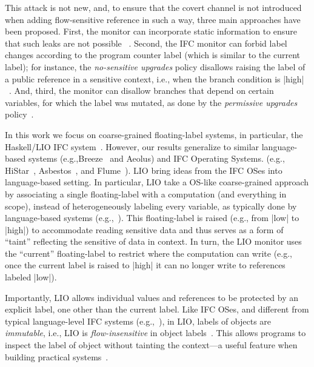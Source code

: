 This attack is not new, and, to ensure that the covert channel is
not introduced when adding flow-sensitive reference in such a way,
three main approaches have been proposed.  First, the monitor can
incorporate static information to ensure that such leaks are not
possible~\cite{Russo:2010,stefan:lio,Breeze} .  Second, the IFC monitor can
forbid label changes according to the program counter label (which is
similar to the current label); for instance, the \emph{no-sensitive
upgrades} policy disallows raising the label of a public reference in
a sensitive context, i.e., when the branch condition is
|high|~\cite{Zdancewic02programminglanguages,Austin:Flanagan:PLAS09}.
And, third, the monitor can disallow branches that depend on certain
variables, for which the label was mutated, as done by the
\emph{permissive upgrades} policy~\cite{Austin:Flanagan:PLAS10}.

In this work we focus on coarse-grained floating-label systems, in
particular, the Haskell/LIO IFC system~\cite{stefan:lio,
stefan:addressing-covert}. 
%
However, our results generalize to similar language-based systems
(e.g.,Breeze~\cite{Breeze} and Aeolus) and IFC Operating Systems.
(e.g., HiStar~\cite{zeldovich:histar},
Asbestos~\cite{Efstathopoulos:2005}, and Flume~\cite{krohn:flume}).
%
LIO bring ideas from the IFC OSes into language-based setting.
%
In particular, LIO take a OS-like coarse-grained approach by
associating a single floating-label with a computation (and everything
in scope), instead of heterogeneously labeling every variable, as
typically done by language-based systems (e.g.,~\cite{jif,FlowCaml}).
%
This floating-label is raised (e.g., from |low| to |high|) to
accommodate reading sensitive data and thus serves as a form of
``taint'' reflecting the sensitive of data in context.
%
In turn, the LIO monitor uses the ``current'' floating-label to
restrict where the computation can write (e.g., once the current label
is raised to |high| it can no longer write to references labeled
|low|).

Importantly, LIO allows individual values and references to be
protected by an explicit label, one other than the current label.
%
Like IFC OSes, and different from typical language-level IFC systems
(e.g.,~\cite{jif,FlowCaml,Hedin13}), in LIO, labels of objects are
\emph{immutable}, i.e., LIO is \emph{flow-insensitive} in object
labels~\cite{Hunt:2006}.
%
This allows programs to inspect the label of object without tainting
the context---a useful feature when building practical
systems~\cite{giffin:hails, Breeze}.

